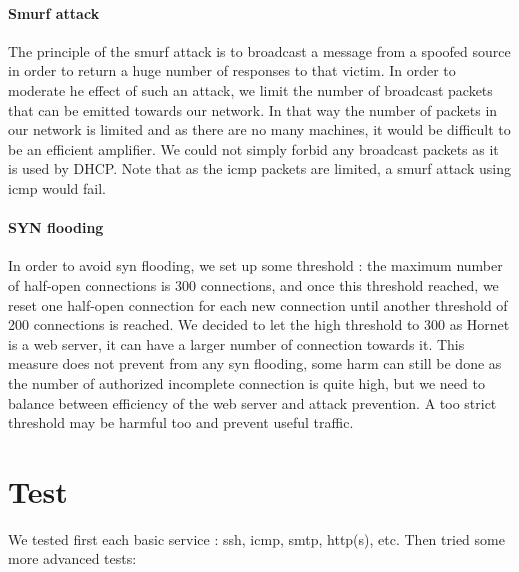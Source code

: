 \documentclass[a4paper,titlepage]{article}
\begin{document}
\paragraph{Smurf attack}
The principle of the smurf attack is to broadcast a message from a spoofed source in order to return a huge number of responses to that victim. 
In order to moderate he effect of such an attack, we limit the number of broadcast packets that can be emitted towards our network. In that way the number of packets in our network is limited and as there are no many machines, it would be difficult to be an efficient amplifier.
We could not simply forbid any broadcast packets as it is used by DHCP. Note that as the icmp packets are limited, a smurf attack using icmp would fail. 

\paragraph{SYN flooding}
In order to avoid syn flooding, we set up some threshold : the maximum number of half-open connections is 300 connections, and once this threshold reached, we reset one half-open connection for each new connection until another threshold of 200 connections is reached. We decided to let the high threshold to 300 as Hornet is a web server, it can have a larger number of connection towards it. This measure does not prevent from any syn flooding, some harm can still be done as the number of authorized incomplete connection is quite high, but we need to balance between efficiency of the web server and attack prevention. A too strict threshold may be harmful too and prevent useful traffic.    

\section{Test}
We tested first each basic service : ssh, icmp, smtp, http(s), etc. Then tried some more advanced tests:  
\end{document}
